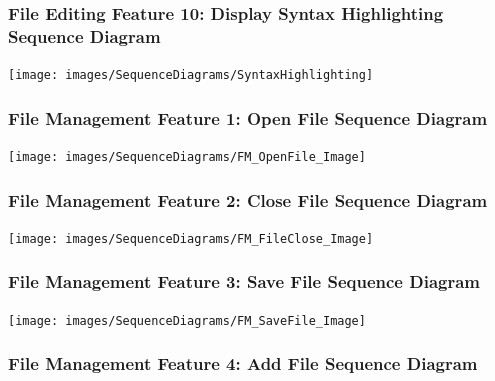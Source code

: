 \documentclass[twoside,letterpaper]{article}
\begin{document}
	\newpage
	
	\subsubsection[File Editing Feature 10: Display Syntax Highlighting Sequence Diagram]{\rmfamily\bfseries\color{black}
		File Editing Feature 10: Display Syntax Highlighting Sequence Diagram}
	\hypertarget{RefHeading22059017292}{}
	
	\bigskip
	
	\texttt{[image: images/SequenceDiagrams/SyntaxHighlighting]}
	
	\newpage
	
	\subsubsection[File Management Feature 1: Open File Sequence Diagram]{\rmfamily\bfseries\color{black}
		File Management Feature 1: Open File Sequence Diagram}
	\hypertarget{RefHeading22059017292}{}
	
	\bigskip
	
	\texttt{[image: images/SequenceDiagrams/FM\_OpenFile\_Image]}
	
	\newpage
	
	\subsubsection[File Management Feature 2: Close File Sequence Diagram]{\rmfamily\bfseries\color{black}
		File Management Feature 2: Close File Sequence Diagram}
	\hypertarget{RefHeading22059017292}{}
	
	\texttt{[image: images/SequenceDiagrams/FM\_FileClose\_Image]}
	
	\newpage
	
	\subsubsection[File Management Feature 3: Save File Sequence Diagram]{\rmfamily\bfseries\color{black}
		File Management Feature 3: Save File Sequence Diagram}
	\hypertarget{RefHeading22059017292}{}
	
	\texttt{[image: images/SequenceDiagrams/FM\_SaveFile\_Image]}
	
	\newpage
	
	\subsubsection[File Management Feature 4: Add File Sequence Diagram]{\rmfamily\bfseries\color{black}
		File Management Feature 4: Add File Sequence Diagram}
	\hypertarget{RefHeading22059017292}{}
	
\end{document}
